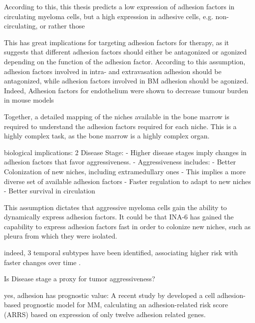 According to this, this thesis
predicts a low expression of adhesion factors in circulating myeloma cells,
but a high expression in adhesive cells, e.g. non-circulating, or rather those


This has great implications for targeting adhesion factors for therapy, as it
suggests that different adhesion factors should either be antagonized or
agonized depending on the function of the adhesion factor. According to this
assumption, adhesion factors involved in intra- and extravasation adhesion should be
antagonized, while adhesion factors involved in BM adhesion  should be agonized. Indeed, Adhesion factors for endothelium
were shown to decrease tumour burden in mouse models \cite{asosinghUniquePathwayHoming2001a,mrozikTherapeuticTargetingNcadherin2015}

Together, a detailed mapping of the niches available in the bone marrow is required
to understand the adhesion factors required for each niche. This is a highly
complex task, as the bone marrow is a highly complex organ.


\unnsubsection{\caddadaptabilitytitle}%
\label{sec:discussion_caddadaptability}%

biological implications:
2 Disease Stage:
- Higher disease stages imply changes in adhesion factors that favor aggressiveness.
- Aggressiveness includes:
- Better Colonization of new niches, including extramedullary ones
- This implies a more diverse set of available adhesion factors
- Faster regulation to adapt to new niches
- Better survival in circulation



This assumption dictates that aggressive myeloma cells gain the ability
to dynamically express adhesion factors.
It could be that INA-6 has gained the capability to express adhesion factors
fast in order to colonize new niches, such as pleura from which they were
isolated.


indeed, 3 temporal subtypes have been identified, associating higher risk with
faster changes over time \cite{keatsClonalCompetitionAlternating2012}.

Is Disease stage a proxy for tumor aggressiveness?


yes, adhesion has prognostic value: A recent study by
\citet{huDevelopmentCellAdhesionbased2024} developed a cell adhesion-based
prognostic model for MM, calculating an adhesion-related risk score (ARRS) based
on expression of only twelve adhesion related genes.


